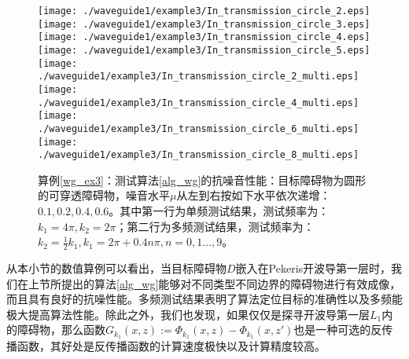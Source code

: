 \begin{figure}[htbp]
  \centering
  \texttt{[image: ./waveguide1/example3/In\_transmission\_circle\_2.eps]}
  \texttt{[image: ./waveguide1/example3/In\_transmission\_circle\_3.eps]}
  \texttt{[image: ./waveguide1/example3/In\_transmission\_circle\_4.eps]}
  \texttt{[image: ./waveguide1/example3/In\_transmission\_circle\_5.eps]}
  \texttt{[image: ./waveguide1/example3/In\_transmission\_circle\_2\_multi.eps]}
  \texttt{[image: ./waveguide1/example3/In\_transmission\_circle\_4\_multi.eps]}
  \texttt{[image: ./waveguide1/example3/In\_transmission\_circle\_6\_multi.eps]}
  \texttt{[image: ./waveguide1/example3/In\_transmission\_circle\_8\_multi.eps]}
  \caption{算例\ref{wg_ex3}：测试算法\ref{alg_wg}的抗噪音性能：目标障碍物为圆形的可穿透障碍物，噪音水平$\mu$从左到右按如下水平依次递增：$0.1,0.2,0.4,0.6$。其中第一行为单频测试结果，测试频率为：$k_1=4\pi,k_2=2\pi$；第二行为多频测试结果，测试频率为：$k_2=\frac{1}{2}k_1,k_1=2\pi+0.4n\pi,n=0,1\ldots,9$。}\label{fig_wg_ex3_2}
\end{figure}
\begin{remark}
	从本小节的数值算例可以看出，当目标障碍物$D$嵌入在Pekeris开波导第一层时，我们在上节所提出的算法\ref{alg_wg}能够对不同类型不同边界的障碍物进行有效成像，而且具有良好的抗噪性能。多频测试结果表明了算法定位目标的准确性以及多频能极大提高算法性能。除此之外，我们也发现，如果仅仅是探寻开波导第一层$L_1$内的障碍物，那么函数$G_{k_1}(x,z):=\Phi_{k_1}(x,z)-\Phi_{k_1}(x,z')$也是一种可选的反传播函数，其好处是反传播函数的计算速度极快以及计算精度较高。
\end{remark}
